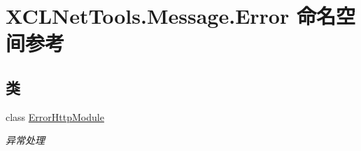 \hypertarget{namespace_x_c_l_net_tools_1_1_message_1_1_error}{}\section{X\+C\+L\+Net\+Tools.\+Message.\+Error 命名空间参考}
\label{namespace_x_c_l_net_tools_1_1_message_1_1_error}
\subsection*{类}
\begin{DoxyCompactItemize}
\item 
class \hyperlink{class_x_c_l_net_tools_1_1_message_1_1_error_1_1_error_http_module}{Error\+Http\+Module}
\begin{DoxyCompactList}\small\item\em 异常处理 \end{DoxyCompactList}\end{DoxyCompactItemize}
